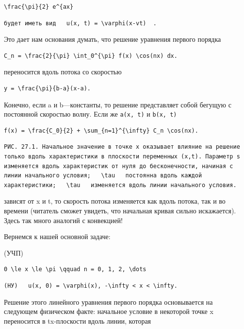 \documentclass[
  ukrainian,
]{article}
\begin{document}
\begin{verbatim}
\frac{\pi}{2} e^{ax}
\end{verbatim}

\begin{verbatim}
будет иметь вид   u(x, t) = \varphi(x-vt)  .
\end{verbatim}

Это дает нам основания думать, что решение уравнения первого порядка

\begin{verbatim}
C_n = \frac{2}{\pi} \int_0^{\pi} f(x) \cos(nx) dx.
\end{verbatim}

переносится вдоль потока со скоростью

\begin{verbatim}
y = \frac{\pi}{b-a}(x-a).
\end{verbatim}

Конечно, если a и b---константы, то решение представляет собой бегущую с
постоянной скоростью волну. Если же \texttt{a(x,\ t)} и
\texttt{b(x,\ t)}

\begin{verbatim}
f(x) = \frac{C_0}{2} + \sum_{n=1}^{\infty} C_n \cos(nx).
\end{verbatim}

\begin{verbatim}
РИС. 27.1. Начальное значение в точке x оказывает влияние на решение только вдоль характеристики в плоскости переменных (x,t). Параметр s изменяется вдоль характеристик от нуля до бесконечности, начиная с линии начального условия;   \tau   постоянна вдоль каждой характеристики;   \tau   изменяется вдоль линии начального условия.
\end{verbatim}

зависят от x и t, то скорость потока изменяется как вдоль потока, так и
во времени (читатель сможет увидеть, что начальная кривая сильно
искажается). Здесь так много аналогий с конвекцией!

Вернемся к нашей основной задаче:

(УЧП)

\begin{verbatim}
0 \le x \le \pi \qquad n = 0, 1, 2, \dots
\end{verbatim}

\begin{verbatim}
(НУ)   u(x, 0) = \varphi(x), -\infty < x < \infty.
\end{verbatim}

Решение этого линейного уравнения первого порядка основывается на
следующем физическом факте: начальное условие в некоторой точке x
переносится в tx-плоскости вдоль линии, которая
\end{document}
